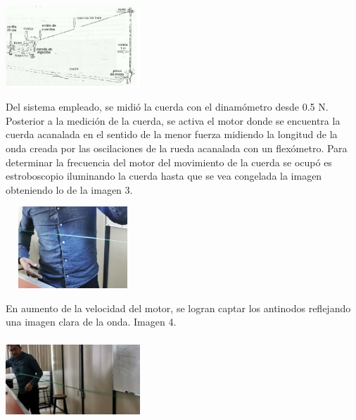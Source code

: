 \documentclass[10pt]{article}
\begin{document}
\begin{multicols}{2}
\begin{center}
	\includegraphics[width=5.05cm,height=3.06cm]{Imagenes/1.png}
	\label{fig:2}
\end{center}
Del sistema empleado, se midió la cuerda con el dinamómetro desde 0.5 N. Posterior a la medición de la cuerda, se activa el motor donde se encuentra la cuerda acanalada en el sentido de la menor fuerza midiendo la longitud de la onda creada por las oscilaciones de la rueda acanalada con un flexómetro. 
Para determinar la frecuencia del motor del movimiento de la cuerda se ocupó es estroboscopio iluminando la cuerda hasta que se vea congelada la imagen obteniendo lo de la imagen 3. 
\begin{center}
	\includegraphics[width=5.05cm,height=3.06cm]{Imagenes/2.png}
	\label{fig:3}
\end{center}
En aumento de la velocidad del motor, se logran captar los antinodos reflejando una imagen clara de la onda. Imagen 4.
\begin{center}
	\includegraphics[width=5.05cm,height=3.06cm]{Imagenes/3.png}
	\label{fig:4}
\end{center}


\end{multicols}
\end{document}
